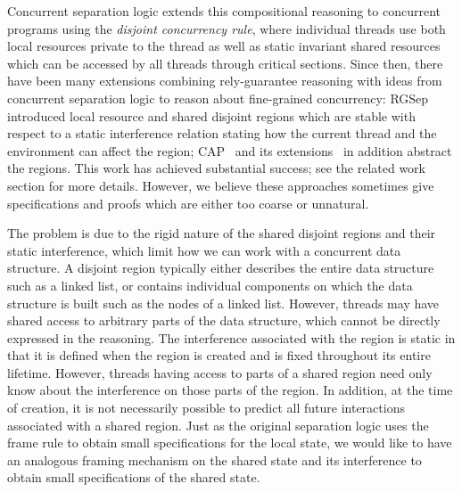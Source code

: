 Concurrent separation logic extends this compositional reasoning to
concurrent programs using the {\em disjoint concurrency rule}, where
individual threads use both local resources private to the
thread as well as static invariant shared resources which can be accessed by
all threads through critical sections. Since then, there have been many
extensions combining rely-guarantee reasoning with ideas from
concurrent separation logic to reason about fine-grained concurrency:
RGSep~\cite{viktor-marriage} 
introduced local resource and shared disjoint
regions which are stable with respect to a static interference
relation stating how the current thread and the environment can affect
the region; CAP~\cite{cap-ecoop10} and its
extensions~\cite{hocap,icap,tada} in addition abstract the
regions. This work has achieved substantial success; see the related
work section for more details. However, we believe these approaches
sometimes give specifications and proofs which are either too coarse
or unnatural.



The problem is due to the rigid nature of the shared disjoint regions and
their static interference, which   limit how we can  work
with a
concurrent data structure. A disjoint region typically either describes 
the entire data structure such as a linked list,  or contains
individual 
components on which the data structure is built such as the nodes of a
linked list. However, threads may have shared access to arbitrary 
parts of the data structure, which cannot be directly expressed in the reasoning.
The interference associated with the region is static in that it is defined when
the region is created and is fixed throughout its entire lifetime. However, 
threads having access to parts of a shared region need only know about the interference on those parts of the
region. In addition, 
at the time  of creation, it is not necessarily possible
to predict all future interactions  associated with  a shared
region. Just as the original separation logic  uses the frame rule to
obtain small specifications for the local state, we would like to have an analogous framing mechanism on the shared state and its
interference to obtain small
specifications of the shared state. 



